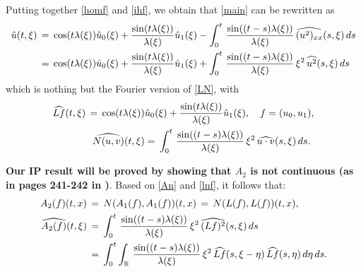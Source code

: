 \documentclass{amsart}
\begin{document}
Putting together \eqref{homf} and \eqref{ihf}, we obtain that \eqref{main} can be rewritten as
\begin{equation}
\aligned
\hat{u}(t,\xi)\,&=\,\cos(t \lambda(\xi)) \hat{u}_0(\xi)+\frac{\sin(t \lambda(\xi))}{\lambda(\xi)} \hat{u}_1(\xi)-\int_0^t\,\frac{\sin((t-s) \lambda(\xi))}{\lambda(\xi)} \,\widehat{(u^2)_{xx}}(s,\xi)\,ds\\
&=\,\cos(t \lambda(\xi)) \hat{u}_0(\xi)+\frac{\sin(t \lambda(\xi))}{\lambda(\xi)} \hat{u}_1(\xi)+\int_0^t\,\frac{\sin((t-s) \lambda(\xi))}{\lambda(\xi)}\, \xi^2\, \widehat{u^2}(s,\xi)\,ds\endaligned
\label{mainf}
\end{equation}
which is nothing but the Fourier version of \eqref{LN}, with
\begin{equation}
\aligned
\widehat{Lf}(t,\xi)\,=\,\cos(t \lambda(\xi))& \hat{u}_0(\xi)+\frac{\sin(t \lambda(\xi))}{\lambda(\xi)} \hat{u}_1(\xi),\quad f=(u_0,u_1),\\
\widehat{N(u,v)}(t,\xi)&=\,\int_0^t\,\frac{\sin((t-s) \lambda(\xi))}{\lambda(\xi)}\, \xi^2\, \widehat{u\cdot v}(s,\xi)\,ds.\endaligned
\label{lnf}
\end{equation}

\textbf{Our IP result will be proved by showing that $A_2$ is not continuous (as in pages 241-242 in \cite{BT06})}. Based on \eqref{An} and \eqref{lnf}, it follows that:
\begin{equation}
\aligned
A_2(f)(t,x)\,&=\,N(A_1(f),A_1(f))(t,x)\,=\,N(L(f),L(f))(t,x),\\
\widehat{A_2(f)}(t,\xi)\,&=\,\int_0^t\,\frac{\sin((t-s) \lambda(\xi))}{\lambda(\xi)}\, \xi^2\, \widehat{(Lf)^2}(s,\xi)\,ds\\
&=\,\int_0^t \int_{\mathbb{R}}\,\frac{\sin((t-s) \lambda(\xi))}{\lambda(\xi)}\, \xi^2\, \widehat{Lf}(s,\xi-\eta)\,\widehat{Lf}(s,\eta)\,d\eta\,ds.\endaligned
\label{A2f}
\end{equation}
\end{document}
